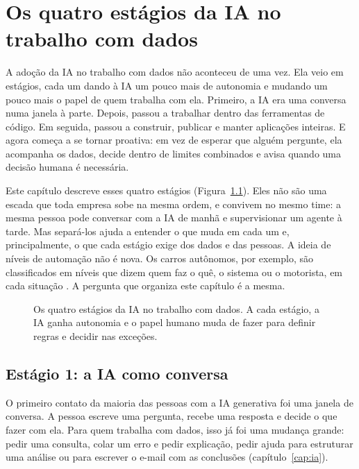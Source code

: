 \chapter{Os quatro estágios da IA no trabalho com dados}
\label{cap:estagios-ia}

A adoção da IA no trabalho com dados não aconteceu de uma vez. Ela veio em estágios, cada
um dando à IA um pouco mais de autonomia e mudando um pouco mais o papel de quem trabalha
com ela. Primeiro, a IA era uma conversa numa janela à parte. Depois, passou a trabalhar
dentro das ferramentas de código. Em seguida, passou a construir, publicar e manter
aplicações inteiras. E agora começa a se tornar proativa: em vez de esperar que alguém
pergunte, ela acompanha os dados, decide dentro de limites combinados e avisa quando uma
decisão humana é necessária.

Este capítulo descreve esses quatro estágios (Figura~\ref{fig:estagios-ia}). Eles não são
uma escada que toda empresa sobe na mesma ordem, e convivem no mesmo time: a mesma pessoa
pode conversar com a IA de manhã e supervisionar um agente à tarde. Mas separá-los ajuda a
entender o que muda em cada um e, principalmente, o que cada estágio exige dos dados e das
pessoas. A ideia de níveis de automação não é nova. Os carros autônomos, por exemplo, são
classificados em níveis que dizem quem faz o quê, o sistema ou o motorista, em cada situação
\parencite{sae2021}. A pergunta que organiza este capítulo é a mesma.

\begin{figure}[htbp]
  \centering
  
  \caption{Os quatro estágios da IA no trabalho com dados. A cada estágio, a IA ganha
    autonomia e o papel humano muda de fazer para definir regras e decidir nas exceções.}
  \label{fig:estagios-ia}
\end{figure}

\section{Estágio 1: a IA como conversa}
\label{sec:estagio-conversa}

O primeiro contato da maioria das pessoas com a IA generativa foi uma janela de conversa. A
pessoa escreve uma pergunta, recebe uma resposta e decide o que fazer com ela. Para quem
trabalha com dados, isso já foi uma mudança grande: pedir uma consulta, colar um erro e pedir
explicação, pedir ajuda para estruturar uma análise ou para escrever o e-mail com as
conclusões (capítulo~\ref{cap:ia}).

